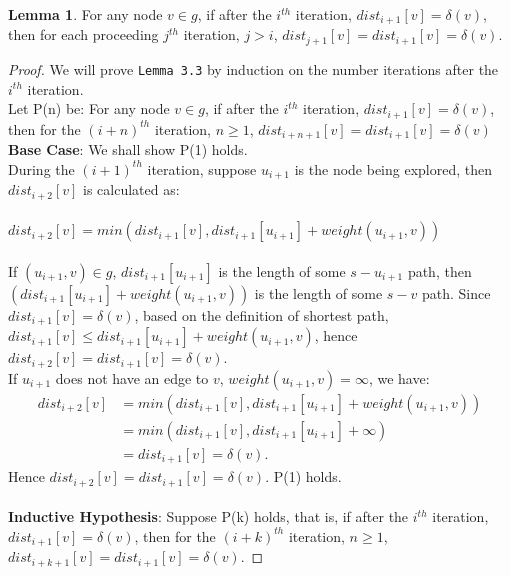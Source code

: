 \documentclass[11pt, oneside]{article}   	%
\newcommand\tab[1][1cm]{\hspace*{#1}}
\theoremstyle{definition}
\newtheorem{sublemma}{Lemma}[section]
\begin{document}
\begin{sublemma}
For any node $v \in g$, if after the $i^{th}$ iteration, $dist_{i+1}[v] = \delta(v)$, then for each proceeding $j^{th}$ iteration, $j > i$, $dist_{j+1}[v] = dist_{i+1}[v] = \delta(v)$. 
\end{sublemma}
\begin{proof}
We will prove \texttt{Lemma 3.3} by induction on the number iterations after the $i^{th}$ iteration. 
\\
Let P(n) be: For any node $v \in g$, if after the $i^{th}$ iteration, $dist_{i+1}[v] = \delta(v)$, then for the $(i+n)^{th}$ iteration, $n \geq 1$, $dist_{i+n+1}[v] = dist_{i+1}[v] = \delta(v)$
\\
\textbf{Base Case}: We shall show P(1) holds. 
\\
During the $(i+1)^{th}$ iteration, suppose $u_{i+1}$ is the node being explored, then $dist_{i+2}[v]$ is calculated as: 
\\\\
  \tab\tab\tab $dist_{i+2}[v] = min(dist_{i+1}[v], dist_{i+1}[u_{i+1}] + weight(u_{i+1}, v))$ 
\\\\
If $(u_{i+1}, v) \in g $, $dist_{i+1}[u_{i+1}]$ is the length of some $s-u_{i+1}$ path, then $(dist_{i+1}[u_{i+1}] + weight(u_{i+1}, v))$ is the length of some $s-v$ path. Since $dist_{i+1}[v] = \delta(v)$, based on the definition of shortest path, $dist_{i+1}[v] \leq dist_{i+1}[u_{i+1}] + weight(u_{i+1}, v)$, hence $dist_{i+2}[v] = dist_{i+1}[v] = \delta(v)$. 
\\
If $u_{i+1}$ does not have an edge to $v$, $weight(u_{i+1}, v) = \infty$, we have: 
\begin{align*}
  dist_{i+2}[v] &= min(dist_{i+1}[v], dist_{i+1}[u_{i+1}] + weight(u_{i+1}, v)) \\
                &= min(dist_{i+1}[v], dist_{i+1}[u_{i+1}] + \infty) \\
                &= dist_{i+1}[v] = \delta(v). 
\end{align*}
Hence $dist_{i+2}[v] = dist_{i+1}[v] = \delta(v)$. P(1) holds. 
\\\\
\textbf{Inductive Hypothesis}: Suppose P(k) holds, that is, if after the $i^{th}$ iteration, $dist_{i+1}[v] = \delta(v)$, then for the $(i+k)^{th}$ iteration, $n \geq 1$, $dist_{i+k+1}[v] = dist_{i+1}[v] = \delta(v)$. 

\end{proof}
\end{document}
